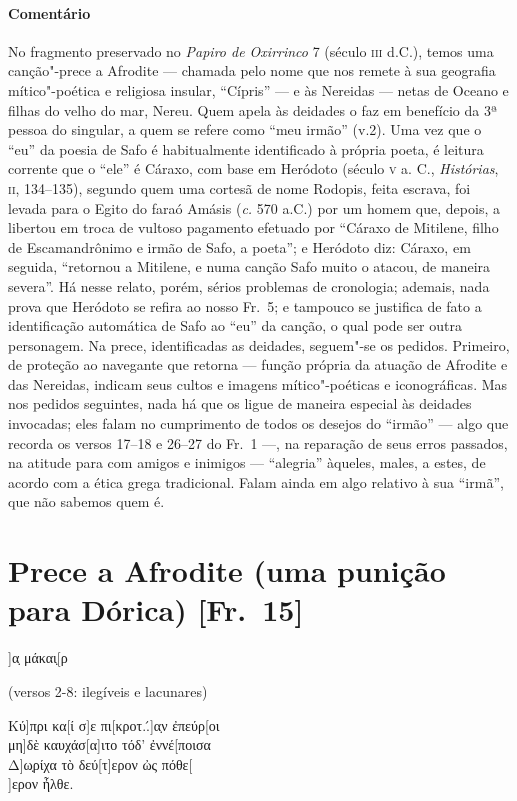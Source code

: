 \pagebreak
{\paragraph{Comentário} No fragmento preservado no \textit{Papiro de Oxirrinco} 7 (século \textsc{iii} d.C.),
temos uma canção"-prece a Afrodite --- chamada pelo nome que nos remete à sua
geografia mítico"-poética e religiosa insular, “Cípris” --- e às Nereidas
--- netas de Oceano e filhas do velho do mar, Nereu. Quem apela às deidades o faz
em benefício da 3ª pessoa do singular, a quem se refere como “meu
irmão” (v.2). Uma vez que o “eu” da poesia de Safo é habitualmente
identificado à própria poeta, é leitura corrente que o “ele” é Cáraxo, com base
em Heródoto (século \textsc{v} a. C., \textit{Histórias}, \textsc{ii}, 134--135), segundo quem uma
cortesã de nome Rodopis, feita escrava, foi levada para o Egito do faraó Amásis
(\textit{c.} 570 a.C.) por um homem que, depois, a libertou em troca de vultoso
pagamento efetuado por “Cáraxo de Mitilene, filho de Escamandrônimo e
irmão de Safo, a poeta”; e Heródoto diz: Cáraxo, em seguida, “retornou
a Mitilene, e numa canção Safo muito o atacou, de maneira severa”. Há nesse
relato, porém, sérios problemas de cronologia; ademais, nada prova que Heródoto se refira ao
nosso Fr.~5; e tampouco se justifica de fato a identificação automática de
Safo ao “eu” da canção, o qual pode ser outra personagem.
Na prece, identificadas as deidades, seguem"-se os
pedidos. Primeiro, de proteção ao navegante que retorna --- função própria da
atuação de Afrodite e das Nereidas, indicam seus cultos e imagens
mítico"-poéticas e iconográficas. Mas nos pedidos seguintes, nada há que os
ligue de maneira especial às deidades invocadas; eles falam no
cumprimento de todos os desejos do “irmão” --- algo que recorda os
versos 17--18 e 26--27 do Fr.~1 ---, na reparação de seus erros passados, na
atitude para com amigos e inimigos --- “alegria” àqueles,
males, a estes, de acordo com a ética grega tradicional. Falam ainda em algo
relativo à sua ``irmã'', que não sabemos quem é.}


\pagebreak
\section{Prece a Afrodite (uma punição para Dórica) [Fr.~15]}

\begin{gkverse}
]α̣ μάκαι̣[ρ

\textnormal{(versos 2-8: ilegíveis e lacunares)}

Κύ]πρι κα[ί σ]ε πι[κροτ..́]α̣ν ἐπεύρ[οι\\
μη]δὲ καυχάσ[α]ιτο τόδ’ ἐννέ[ποισα\\
Δ]ω̣ρίχα τὸ δεύ[τ]ερον ὠς πόθε[\\
]ερον ἦλθε.

\end{gkverse}

